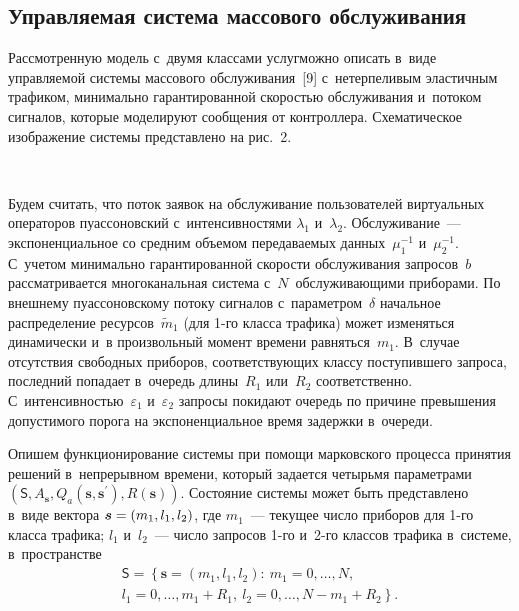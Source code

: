 \begin{multicols}{2}
  
  \section{Управляемая система массового обслуживания}
  
  Рассмотренную модель с~двумя классами услуг\linebreak можно описать в~виде 
управляемой системы массового обслуживания~[9] с~нетерпеливым 
эластичным трафиком, минимально гарантированной ско\-ростью обслуживания 
и~потоком сигналов, \mbox{которые} моделируют сообщения от контроллера. 
Схематическое изображение системы представлено на рис.~2. 

\begin{figure*} %
\vspace*{1pt}
  \begin{center}  
    \mbox{%
\epsfxsize=128.916mm
}

\end{center}
\vspace*{-6pt}
\end{figure*} 
  
  Будем считать, что поток заявок на обслуживание пользователей 
виртуальных операторов пуассоновский с~интенсивностями $\lambda_1$ 
и~$\lambda_2$. Обслуживание~--- экспоненциальное со средним объемом 
передаваемых данных~$\mu_1^{-1}$ и~$\mu_2^{-1}$. С~учетом минимально 
гарантированной скорости обслуживания запросов~$b$ рассматривается 
многоканальная система с~$N$~обслуживающими приборами. По внешнему 
пуассоновскому потоку сигналов с~параметром~$\delta$ начальное 
распределение ресурсов~$\tilde{m}_1$ (для 1-го класса трафика) может 
изменяться динамически и~в произвольный момент времени равняться~$m_1$. 
В~случае отсутствия свободных приборов, соответствующих классу 
поступившего запроса, последний попадает в~очередь длины~$R_1$ или~$R_2$ 
соответственно. С~интенсивностью~$\varepsilon_1$ и~$\varepsilon_2$ запросы 
покидают очередь по причине превышения допустимого порога на 
экспоненциальное время задержки в~оче\-реди. 
  
  Опишем функционирование системы при помощи марковского процесса 
принятия решений в~непрерывном времени, который задается четырьмя 
параметрами $\left( \mathsf{S}, A_{\bm{s}}, Q_a(\bm{s},\bm{s}^\prime), 
R(\bm{s})\right)$. Состояние системы может быть представлено в~виде вектора 
$\bm{s}\hm= (m_1, l_1, l_2)$, где $m_1$~--- текущее число приборов для 1-го 
класса трафика; $l_1$ и~$l_2$~--- число запросов \mbox{1-го} и~2-го классов трафика 
в~системе, в~пространстве 
  \begin{multline*}
  \mathsf{S}=\left\{ \bm{s}=\left( m_1,l_1,l_2\right):\ m_1=0,\ldots , N,\right.\\
 \!\! \left. l_1=0, \ldots , m_1+R_1,\ l_2=0, \ldots , N-m_1+R_2\right\}\!.\!\!
  \end{multline*}
    

\end{multicols}

